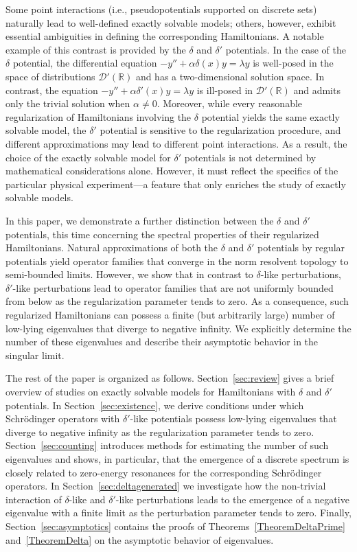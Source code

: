 \documentclass[reqno]{amsart}
\theoremstyle{definition}
\theoremstyle{remark}
\numberwithin{equation}{section}
\newcommand{\Real}{\mathbb R}
\newcommand{\cD}{\mathcal{D}}
\begin{document}
Some point interactions (i.e., pseudopotentials supported on discrete sets) naturally lead to well-defined exactly solvable models; others, however, exhibit essential ambiguities in defining the corresponding Hamiltonians. A notable example of this contrast is provided by the $\delta$ and $\delta'$ potentials. In the case of the $\delta$ potential, the differential equation  $-y''+\alpha\delta(x)y=\lambda y$ is well-posed in the space of distributions $\cD'(\Real)$ and has a two-dimensional solution space. In contrast, the equation $-y''+\alpha\delta'(x)y=\lambda y$ is ill-posed in $\cD'(\Real)$ and admits only the trivial solution when $\alpha\neq 0$. Moreover, while every reasonable regularization of Hamiltonians involving the $\delta$ potential yields the same exactly solvable model, the $\delta'$ potential is sensitive to the regularization procedure, and different approximations may lead to different point interactions. As a result, the choice of the exactly solvable model for $\delta'$ potentials is not determined by mathematical considerations alone. However, it must reflect the specifics of the particular physical experiment---a feature that only enriches the study of exactly solvable models.

In this paper, we demonstrate a further distinction between the $\delta$ and $\delta'$ potentials, this time concerning the spectral properties of their regularized Hamiltonians. Natural approximations of both the $\delta$ and $\delta'$ potentials by regular potentials yield operator families that converge in the norm resolvent topology to semi-bounded limits. However, we show that in contrast to $\delta$-like perturbations, $\delta'$-like perturbations lead to operator families that are not uniformly bounded from below as the regularization parameter tends to zero. As a consequence, such regularized Hamiltonians can possess a finite (but arbitrarily large) number of low-lying eigenvalues that diverge to negative infinity. We explicitly determine the number of these eigenvalues and describe their asymptotic behavior in the singular limit.

The rest of the paper is organized as follows.  Section~\ref{sec:review} gives a brief overview of studies on exactly solvable models for Hamiltonians with $\delta$ and $\delta'$ potentials. In Section~\ref{sec:existence}, we derive conditions under which Schr\"odinger operators with $\delta'$-like potentials possess low-lying eigenvalues that diverge to negative infinity as the regularization parameter tends to zero.
Section~\ref{sec:counting} introduces methods for estimating the number of such eigenvalues and shows, in particular, that the emergence of a discrete spectrum is closely related to zero-energy resonances for the corresponding Schr\"odinger operators. In Section~\ref{sec:deltagenerated} we investigate how the non-trivial interaction of $\delta$-like and $\delta'$-like perturbations leads to the emergence of a negative eigenvalue with a finite limit as the perturbation parameter tends to zero. Finally, Section~\ref{sec:asymptotics} contains the proofs of Theorems~\ref{TheoremDeltaPrime} and~\ref{TheoremDelta} on the asymptotic behavior of eigenvalues.
\end{document}
